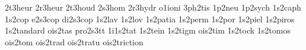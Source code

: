 {2t3heur                                                                         
2r3heur                                                                         
2t3houd                                                                         
2s3hom                                                                          
2r3hydr                                                                         
o1ioni                                                                          
3ph2tis                                                                         
1p2neu                                                                          
1p2sych                                                                         
1s2caph                                                                         
1s2cop                                                                          
e2s3cop                                                                         
di2s3cop                                                                        
1s2lav                                                                          
1s2lov                                                                          
1s2patia                                                                        
1s2perm                                                                         
1s2por                                                                          
1s2piel                                                                         
1s2piros                                                                        
1s2tandard                                                                      
ois2tas                                                                         
pro2s3tt                                                                        
1i1s2tat                                                                        
1s2tein                                                                         
1s2tigm                                                                         
ois2tim                                                                         
1s2tock                                                                         
1s2tomos                                                                        
ois2tom                                                                         
ois2trad                                                                        
ois2tratu                                                                       
ois2triction                                                                    
}
